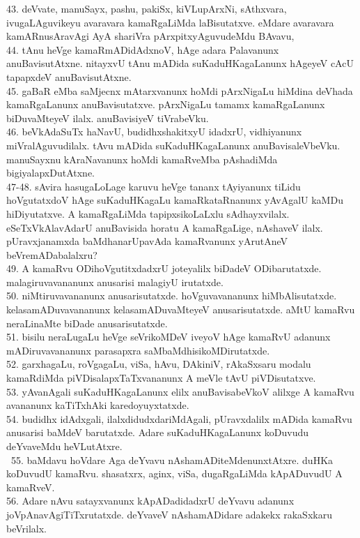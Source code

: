 \documentclass{article}
\begin{document}
43. deVvate, manuSayx, pashu, pakiSx, kiVLupArxNi, sAthxvara, ivugaLAguvikeyu avaravara kamaRgaLiMda laBisutatxve. eMdare avaravara kamARnusAravAgi AyA shariVra pArxpitxyAguvudeMdu BAvavu,\\
44. tAnu heVge kamaRmADidAdxnoV, hAge adara Palavanunx anuBavisutAtxne. nitayxvU tAnu mADida suKaduHKagaLanunx hAgeyeV cAcU tapapxdeV anuBavisutAtxne.\\
45. gaBaR eMba saMjecnx mAtarxvanunx hoMdi pArxNigaLu hiMdina deVhada kamaRgaLanunx anuBavisutatxve. pArxNigaLu tamamx kamaRgaLanunx biDuvaMteyeV ilalx. anuBavisiyeV tiVrabeVku.\\
46. beVkAdaSuTx haNavU, budidhxshakitxyU idadxrU, vidhiyanunx miVralAguvudilalx. tAvu mADida suKaduHKagaLanunx anuBavisaleVbeVku. manuSayxnu kAraNavanunx hoMdi kamaRveMba pAshadiMda bigiyalapxDutAtxne.\\
47-48. sAvira hasugaLoLage karuvu heVge tananx tAyiyanunx tiLidu hoVgutatxdoV hAge suKaduHKagaLu kamaRkataRnanunx yAvAgalU kaMDu hiDiyutatxve. A kamaRgaLiMda tapipxsikoLaLxlu sAdhayxvilalx. eSeTxVkAlavAdarU anuBavisida horatu A kamaRgaLige, nAshaveV ilalx. pUravxjanamxda baMdhanarUpavAda kamaRvanunx yArutAneV beVremADabalalxru?\\
49. A kamaRvu ODihoVgutitxdadxrU joteyalilx biDadeV ODibarutatxde. malagiruvavananunx anusarisi malagiyU irutatxde.\\
50. niMtiruvavananunx anusarisutatxde. hoVguvavananunx hiMbAlisutatxde. kelasamADuvavananunx kelasamADuvaMteyeV anusarisutatxde. aMtU kamaRvu neraLinaMte biDade anusarisutatxde.\\
51. bisilu neraLugaLu heVge seVrikoMDeV iveyoV hAge kamaRvU adanunx mADiruvavananunx parasapxra saMbaMdhisikoMDirutatxde.\\
52. garxhagaLu, roVgagaLu, viSa, hAvu, DAkiniV, rAkaSxsaru modalu kamaRdiMda piVDisalapxTaTxvananunx A meVle tAvU piVDisutatxve.\\
53. yAvanAgali suKaduHKagaLanunx elilx anuBavisabeVkoV alilxge A kamaRvu avananunx kaTiTxhAki karedoyuyxtatxde.\\
54. budidhx idAdxgali, ilalxdidudxdariMdAgali, pUravxdalilx mADida kamaRvu anusarisi baMdeV barutatxde. Adare suKaduHKagaLanunx koDuvudu deYvaveMdu heVLutAtxre.\\\
55. baMdavu hoVdare Aga deYvavu nAshamADiteMdenunxtAtxre. duHKa koDuvudU kamaRvu. shasatxrx, aginx, viSa, dugaRgaLiMda kApADuvudU A kamaRveV.\\
56. Adare nAvu satayxvanunx kApADadidadxrU deYvavu adanunx joVpAnavAgiTiTxrutatxde. deYvaveV nAshamADidare adakekx rakaSxkaru beVrilalx.\\
\end{document}
